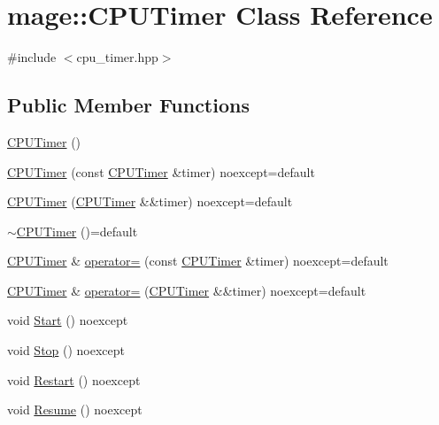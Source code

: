\hypertarget{classmage_1_1_c_p_u_timer}{}\section{mage\+:\+:C\+P\+U\+Timer Class Reference}
\label{classmage_1_1_c_p_u_timer}


{\ttfamily \#include $<$cpu\+\_\+timer.\+hpp$>$}

\subsection*{Public Member Functions}
\begin{DoxyCompactItemize}
\item 
\hyperlink{classmage_1_1_c_p_u_timer_a398b1d5c99bcb09fbe37b2d74547b3e0}{C\+P\+U\+Timer} ()
\item 
\hyperlink{classmage_1_1_c_p_u_timer_a23afe7d7b5d85ecf1275f750a935e7c3}{C\+P\+U\+Timer} (const \hyperlink{classmage_1_1_c_p_u_timer}{C\+P\+U\+Timer} \&timer) noexcept=default
\item 
\hyperlink{classmage_1_1_c_p_u_timer_a7915bc9952e7607ffbe93f18dd1cb0b4}{C\+P\+U\+Timer} (\hyperlink{classmage_1_1_c_p_u_timer}{C\+P\+U\+Timer} \&\&timer) noexcept=default
\item 
\hyperlink{classmage_1_1_c_p_u_timer_a32583449026cf0589104767339486d4b}{$\sim$\+C\+P\+U\+Timer} ()=default
\item 
\hyperlink{classmage_1_1_c_p_u_timer}{C\+P\+U\+Timer} \& \hyperlink{classmage_1_1_c_p_u_timer_a22c40a268b8638b6f78c678fc392e4b2}{operator=} (const \hyperlink{classmage_1_1_c_p_u_timer}{C\+P\+U\+Timer} \&timer) noexcept=default
\item 
\hyperlink{classmage_1_1_c_p_u_timer}{C\+P\+U\+Timer} \& \hyperlink{classmage_1_1_c_p_u_timer_a9c831808d8caa71a019b5e4a6ffe360c}{operator=} (\hyperlink{classmage_1_1_c_p_u_timer}{C\+P\+U\+Timer} \&\&timer) noexcept=default
\item 
void \hyperlink{classmage_1_1_c_p_u_timer_abcb6e468bad9fb821c18502b6445b696}{Start} () noexcept
\item 
void \hyperlink{classmage_1_1_c_p_u_timer_ae2fa5b36f436fd160d7f5b91783c0f11}{Stop} () noexcept
\item 
void \hyperlink{classmage_1_1_c_p_u_timer_aad56acfa4f2990d6894d75721ba16f15}{Restart} () noexcept
\item 
void \hyperlink{classmage_1_1_c_p_u_timer_a8285a7306896f52adb093284d6c9da4d}{Resume} () noexcept
\item 

\end{DoxyCompactItemize}
